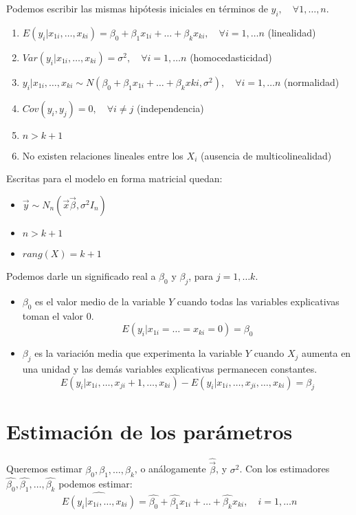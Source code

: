 \documentclass{report}
\theoremstyle{remark}
\theoremstyle{remark}
\theoremstyle{remark}
\theoremstyle{definition}
\theoremstyle{definition}
\theoremstyle{definition}
\begin{document}
Podemos escribir las mismas hipótesis iniciales en términos de $y_i, \quad \forall 1, \dots, n$.
\begin{enumerate}
    \item $E(y_i | x_{1i}, \dots, x_{ki}) = \beta_0 + \beta_1x_{1i} + \dots + \beta_kx_{ki}, \quad \forall i = 1, \dots n$ (linealidad)
    \item $Var(y_i | x_{1i}, \dots, x_{ki}) = \sigma^2, \quad \forall i = 1, \dots n$ (homocedasticidad)
    \item $y_i | x_{1i}, \dots, x_{ki} \sim N(\beta_0 + \beta_1x_{1i} + \dots + \beta_kx{ki}, \sigma^2), \quad \forall i = 1, \dots n$ (normalidad)
    \item $Cov(y_i, y_j) = 0, \quad \forall i \neq j$ (independencia)
    \item $n > k+1$
    \item No existen relaciones lineales entre los $X_i$ (ausencia de multicolinealidad)
\end{enumerate}
Escritas para el modelo en forma matricial quedan:
\begin{itemize}
    \item $\vec{y} \sim N_n(\vec{x}\vec{\beta}, \sigma^2 I_n)$
    \item $n > k+1$
    \item $rang(X) = k+1$
\end{itemize}

Podemos darle un significado real a $\beta_0$ y $\beta_j$, para $j = 1, \dots k$.
\begin{itemize}
    \item $\beta_0$ es el valor medio de la variable $Y$ cuando todas las variables explicativas toman el valor 0.
          $$E(y_i | x_{1i} = \dots = x_{ki} = 0) = \beta_0$$
    \item $\beta_j$ es la variación media que experimenta la variable $Y$ cuando $X_j$ aumenta en una unidad y las demás variables explicativas permanecen constantes.
          $$E(y_i | x_{1i}, \dots, x_{ji} + 1, \dots, x_{ki}) - E(y_i | x_{1i}, \dots, x_{ji}, \dots, x_{ki}) = \beta_j$$
\end{itemize}

\section{Estimación de los parámetros}
Queremos estimar $\beta_0, \beta_1, \dots, \beta_k$, o análogamente $\hat{\vec{\beta}}$, y $\sigma^2$.
Con los estimadores $\hat{\beta_0}, \hat{\beta_1}, \dots, \hat{\beta_k}$ podemos estimar:
$$\hat{E(y_i | x_{1i}, \dots, x_{ki})} = \hat{\beta_0} + \hat{\beta_1}x_{1i} + \dots + \hat{\beta_k}x_{ki}, \quad i = 1, \dots n$$
\end{document}
